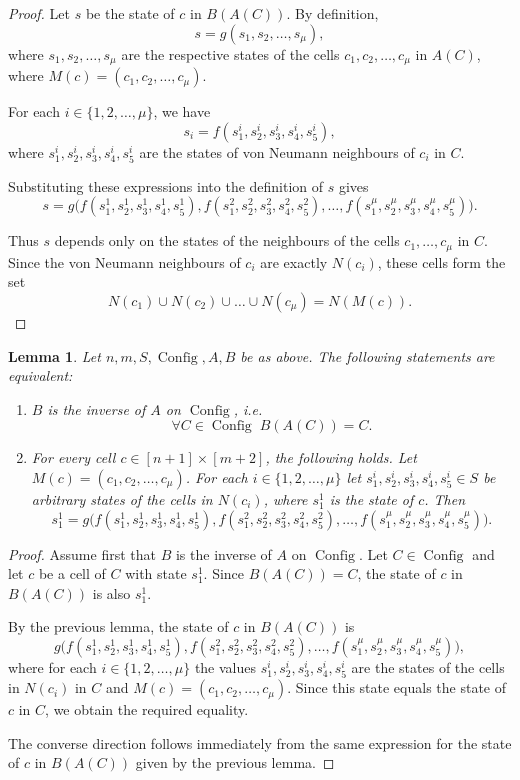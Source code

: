 \documentclass{article}
\theoremstyle{plain}
\newtheorem{lemma}[theorem]{Lemma}
\theoremstyle{definition}
\DeclareMathOperator{\Config}{Config}
\begin{document}
\begin{proof}
    Let $s$ be the state of $c$ in $B(A(C))$. By definition, 
    \[
    s = g(s_1, s_2, \dots, s_\mu),
    \]
   where $s_1, s_2, \dots, s_\mu$ are the respective states of the cells
    $c_1, c_2, \dots, c_\mu$ in $A(C)$, where $M(c) = (c_1, c_2, \dots, c_\mu)$.
    
    For each $i \in \{1, 2, \dots, \mu\}$, we have
    \[
    s_i = f(s^i_1, s^i_2, s^i_3, s^i_4, s^i_5),
    \]
    where $s^i_1, s^i_2, s^i_3, s^i_4, s^i_5$ are the states of von Neumann neighbours of $c_i$ in $C$. 
    
    Substituting these expressions into the definition of $s$ gives
    \[
    s = g\bigl(f(s^1_1, s^1_2, s^1_3, s^1_4, s^1_5), f(s^2_1, s^2_2, s^2_3, s^2_4, s^2_5), \dots, f(s^\mu_1, s^\mu_2, s^\mu_3, s^\mu_4, s^\mu_5)\bigr).
    \]

Thus $s$ depends only on the states of the neighbours of the cells
$c_1,\dots,c_\mu$ in $C$. Since the von Neumann neighbours of $c_i$ are exactly
$N(c_i)$, these cells form the set
\[
N(c_1) \cup N(c_2) \cup \dots \cup N(c_\mu) = N(M(c)).
\]
\end{proof}

\begin{lemma}\label{lm:invertible_condition}
    Let $n,m, S, \Config, A, B$ be as above. The following statements are equivalent:
    \begin{enumerate}[label=(\roman*)]
        \item $B$ is the inverse of $A$ on $\Config$, i.e.
    \[
    \forall C \in \Config \; B(A(C)) = C .
    \]

        \item For every cell $c \in [n+1]\times[m+2]$, the following holds.
Let $M(c) = (c_1,c_2,\dots,c_\mu)$. For each $i \in \{1,2,\dots,\mu\}$ let
$s^i_1,s^i_2,s^i_3,s^i_4,s^i_5 \in S$ be arbitrary states of the cells in
$N(c_i)$, where $s^1_1$ is the state of $c$.
Then
\[
s^1_1 =
g\bigl(
f(s^1_1,s^1_2,s^1_3,s^1_4,s^1_5),
f(s^2_1,s^2_2,s^2_3,s^2_4,s^2_5),
\dots,
f(s^\mu_1,s^\mu_2,s^\mu_3,s^\mu_4,s^\mu_5)
\bigr).
\]
    \end{enumerate}
\end{lemma}
\begin{proof}
Assume first that $B$ is the inverse of $A$ on $\Config$. Let $C \in \Config$
and let $c$ be a cell of $C$ with state $s^1_1$. Since $B(A(C))=C$, the state
of $c$ in $B(A(C))$ is also $s^1_1$.

By the previous lemma, the state of $c$ in $B(A(C))$ is
\[
g\bigl(
f(s^1_1,s^1_2,s^1_3,s^1_4,s^1_5),
f(s^2_1,s^2_2,s^2_3,s^2_4,s^2_5),
\dots,
f(s^\mu_1,s^\mu_2,s^\mu_3,s^\mu_4,s^\mu_5)
\bigr),
\]
where for each $i \in \{1,2,\dots,\mu\}$ the values
$s^i_1,s^i_2,s^i_3,s^i_4,s^i_5$ are the states of the cells in $N(c_i)$ in $C$
and $M(c)=(c_1,c_2,\dots,c_\mu)$. Since this state equals the state of $c$ in $C$,
we obtain the required equality.

The converse direction follows immediately from the same expression for the
state of $c$ in $B(A(C))$ given by the previous lemma.
\end{proof}
\end{document}
